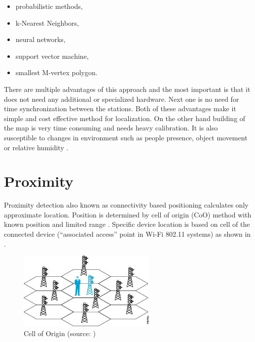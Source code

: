 \begin{itemize}
	\item probabilistic methods,
	\item k-Nearest Neighbors,
	\item neural networks,
	\item support vector machine,
	\item smallest M-vertex polygon.
\end{itemize}

There are multiple advantages of this approach and the most important is that it does not need any additional or specialized hardware. Next one is no need for time synchronization between the stations. Both of these advantages make it simple and cost effective method for localization. On the other hand building of the map is very time consuming and needs heavy calibration. It is also susceptible to changes in environment such as people presence, object movement or relative humidity \cite{IILUBLEB, RSSFofIFD}.

\section{Proximity}\label{sec:Proximity}
Proximity detection also known as connectivity based positioning calculates only approximate location. Position is determined by cell of origin (CoO) method with known position and limited range \cite{RAinWILTaS}. Specific device location is based on cell of the connected device (\enquote{associated access} point in Wi-Fi 802.11 systems) as shown in  \cite{WiFiLBS}.

\begin{figure}[h!]
	\begin{centering}
		\includegraphics[width=0.6\textwidth]{img/cell_of_origin}
		\par\end{centering}
	\caption{Cell of Origin (source: \cite{WiFiLBS})\label{fig:CellOfOrigin}}
	\label{fig04c02}
\end{figure}


